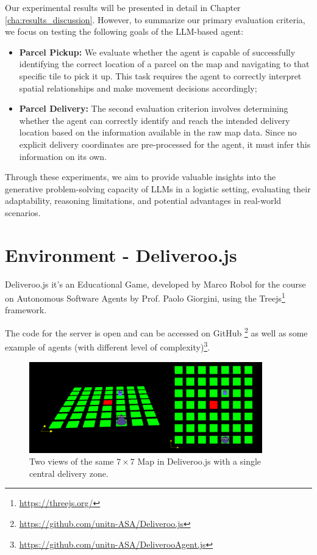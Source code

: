 Our experimental results will be presented in detail in Chapter
\ref{cha:results_discussion}. However, to summarize our primary evaluation
criteria, we focus on testing the following goals of the LLM-based agent:

\begin{itemize}
  \item \textbf{Parcel Pickup:} We evaluate whether the agent is capable of
    successfully identifying the correct location of a parcel on the map and
    navigating to that specific tile to pick it up. This task requires the agent
    to correctly interpret spatial relationships and make movement decisions accordingly;

  \item \textbf{Parcel Delivery:} The second evaluation criterion involves
    determining whether the agent can correctly identify and reach the intended
    delivery location based on the information available in the raw map data. Since
    no explicit delivery coordinates are pre-processed for the agent, it must
    infer this information on its own.
\end{itemize}

Through these experiments, we aim to provide valuable insights into the generative
problem-solving capacity of LLMs in a logistic setting, evaluating their
adaptability, reasoning limitations, and potential advantages in real-world
scenarios.

\section{Environment - Deliveroo.js}
\label{sec:environment_deliveroo_js}

Deliveroo.js it's an Educational Game, developed by Marco Robol for the course
on Autonomous Software Agents by Prof. Paolo Giorgini, using the Treejs\footnote{\url{https://threejs.org/}}
framework.

The code for the server is open and can be accessed on GitHub \footnote{\url{https://github.com/unitn-ASA/Deliveroo.js}}
as well as some example of agents (with different level of complexity)\footnote{\url{https://github.com/unitn-ASA/DeliverooAgent.js}}.

\begin{figure}[h!]
  \centering
  \includegraphics[width=0.90\textwidth]{
    images/experiment_setting/deliveroo_js.png
  }
  \caption{Two views of the same $7 \times 7$ Map in Deliveroo.js with a single
  central delivery zone.}
  \label{fig:deliveroo_js}
\end{figure}

